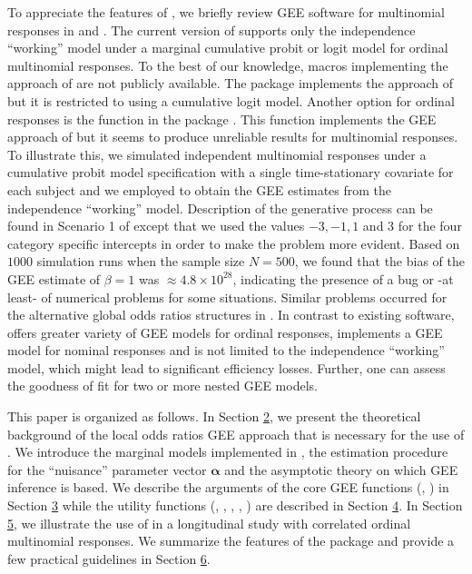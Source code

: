 \documentclass[
]{jss}
\begin{document}
To appreciate the features of , we briefly review GEE
software for multinomial responses in  \citep{SAS} and
. The current version of  supports only the
independence ``working'' model under a marginal cumulative probit or
logit model for ordinal multinomial responses. To the best of our
knowledge,  macros \citep{Williamson1998, Yu2004}
implementing the approach of \citet{Williamson1995} are not publicly
available. The  package  \citep{Parsons2013}
implements the approach of \citet{Parsons2006} but it is restricted to
using a cumulative logit model. Another option for ordinal responses is
the function  in the  package 
\citep{Hojsgaard2006}. This function implements the GEE approach of
\citet{Heagerty1996} but it seems to produce unreliable results for
multinomial responses. To illustrate this, we simulated independent
multinomial responses under a cumulative probit model specification with
a single time-stationary covariate for each subject and we employed
 to obtain the GEE estimates from the independence
``working'' model. Description of the generative process can be found in
Scenario 1 of \citet{Touloumis2012} except that we used the values
\(-3,-1,1\) and \(3\) for the four category specific intercepts in order
to make the problem more evident. Based on \(1000\) simulation runs when
the sample size \(N=500\), we found that the bias of the GEE estimate of
\(\beta=1\) was \(\approx 4.8 \times 10^{28}\), indicating the presence
of a bug or -at least- of numerical problems for some situations.
Similar problems occurred for the alternative global odds ratios
structures in . In contrast to existing software,
 offers greater variety of GEE models for ordinal
responses, implements a GEE model for nominal responses and is not
limited to the independence ``working'' model, which might lead to
significant efficiency losses. Further, one can assess the goodness of
fit for two or more nested GEE models.

This paper is organized as follows. In Section
\protect\hyperlink{GEENotation}{2}, we present the theoretical
background of the local odds ratios GEE approach that is necessary for
the use of . We introduce the marginal models implemented
in , the estimation procedure for the ``nuisance''
parameter vector \(\boldsymbol \alpha\) and the asymptotic theory on
which GEE inference is based. We describe the arguments of the core GEE
functions (, ) in Section
\protect\hyperlink{Description1}{3} while the utility functions
(, , , ,
) are described in Section
\protect\hyperlink{Description2}{4}. In Section
\protect\hyperlink{Example}{5}, we illustrate the use of 
in a longitudinal study with correlated ordinal multinomial responses.
We summarize the features of the package and provide a few practical
guidelines in Section \protect\hyperlink{Summary}{6}.
\end{document}
